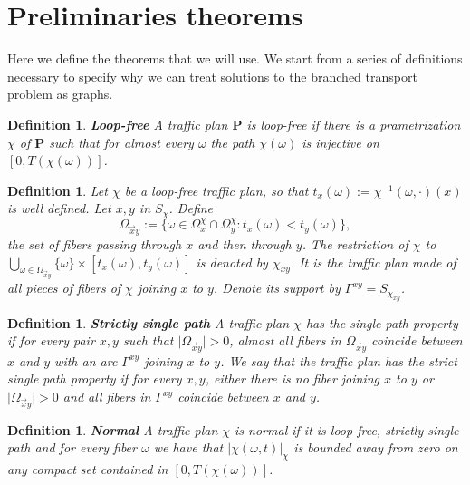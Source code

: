 \documentclass[11pt,reqno,a4paper]{amsart}
\numberwithin{equation}{section}
\theoremstyle{mytheorem}
\newtheorem{definition}[subsubsection]{Definition}
\theoremstyle{myremark}
\theoremstyle{myparagraph}
\begin{document}
    \section{Preliminaries theorems}

    Here we define the theorems that we will use. We start from a series of definitions necessary to specify why we can
    treat solutions to the branched transport problem as graphs.


    \begin{definition}
        \textbf{Loop-free}
        A traffic plan $\mathbf{P}$ is loop-free if there is a prametrization $\chi$ of $\mathbf{P}$ such that for almost every $\omega$
        the path $\chi(\omega)$ is injective on $[0, T(\chi(\omega))]$.
    \end{definition}

    \begin{definition}
        Let $\chi$ be a loop-free traffic plan, so that $t_x(\omega) := \chi^{-1}(\omega, \cdot)(x)$ is well defined.
        Let $x, y$ in $S_\chi$. Define
        \[
            \Omega_{\overset{\rightarrow}{x}y} := \{\omega \in \Omega_x^\chi \cap \Omega_y^\chi : t_x(\omega) < t_y(\omega)\},
        \]
        the set of fibers passing through $x$ and then through $y$.
        The restriction of $\chi$ to $\bigcup_{\omega \in \Omega_{\overset{\rightarrow}{x}y}} \{\omega\} \times [t_x(\omega), t_y(\omega)]$ is denoted by $\chi_{xy}$.
        It is the traffic plan made of all pieces of fibers of $\chi$ joining $x$ to $y$. Denote its support by $\Gamma^{xy} = S_{\chi_{xy}}$.

    \end{definition}

    \begin{definition}
        \textbf{Strictly single path}
        A \textit{traffic plan} $\chi$ has the \textit{single path property} if for every pair $x, y$ such that
        $\lvert \Omega_{\overset{\rightarrow}{x}y} \rvert > 0$, almost all fibers in $\Omega_{\overset{\rightarrow}{x}y}$
        coincide between $x$ and $y$ with an arc $\Gamma^{xy}$ joining $x$ to $y$. We say that the traffic plan has
        the \textit{strict single path property} if for every $x, y$, either there is no fiber joining $x$ to $y$
        or $\lvert \Omega_{\overset{\rightarrow}{x}y} \rvert > 0$ and all fibers in $\Gamma^{xy}$ coincide between $x$ and $y$.
    \end{definition}



    \begin{definition}
        \textbf{Normal}
        A traffic plan $\chi$ is normal if it is loop-free, strictly single path and for every fiber $\omega$
        we have that $| \chi(\omega, t)|_\chi$ is bounded away from zero on any compact set contained in $[0, T(\chi(\omega))]$.
    \end{definition}
\end{document}

